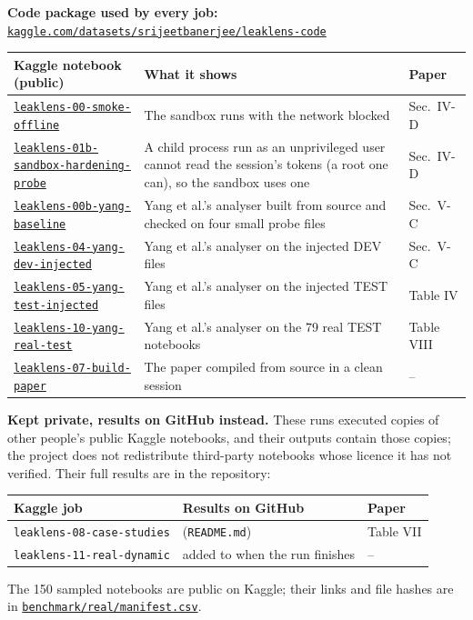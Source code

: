 \documentclass[10pt,a4paper]{article}
\newcommand{\K}[1]{\href{https://www.kaggle.com/code/srijeetbanerjee/#1}{\texttt{#1}}}
\newcommand{\G}[1]{\href{https://github.com/bytes06runner/LeakLens/tree/main/#1}{\texttt{\detokenize{#1}}}}
\begin{document}
\textbf{Code package used by every job:} \href{https://www.kaggle.com/datasets/srijeetbanerjee/leaklens-code}{\texttt{kaggle.com/datasets/srijeetbanerjee/leaklens-code}}

\begin{tabularx}{\textwidth}{@{}lXl@{}}
\toprule
Kaggle notebook (public) & What it shows & Paper \\
\midrule
\K{leaklens-00-smoke-offline} & The sandbox runs with the network blocked & Sec.\ IV-D \\
\K{leaklens-01b-sandbox-hardening-probe} & A child process run as an unprivileged user cannot read the session's tokens (a root one can), so the sandbox uses one & Sec.\ IV-D \\
\K{leaklens-00b-yang-baseline} & Yang et al.'s analyser built from source and checked on four small probe files & Sec.\ V-C \\
\K{leaklens-04-yang-dev-injected} & Yang et al.'s analyser on the injected DEV files & Sec.\ V-C \\
\K{leaklens-05-yang-test-injected} & Yang et al.'s analyser on the injected TEST files & Table IV \\
\K{leaklens-10-yang-real-test} & Yang et al.'s analyser on the 79 real TEST notebooks & Table VIII \\
\K{leaklens-07-build-paper} & The paper compiled from source in a clean session & -- \\
\bottomrule
\end{tabularx}

\medskip
\textbf{Kept private, results on GitHub instead.} These runs executed copies of other people's public Kaggle
notebooks, and their outputs contain those copies; the project does not redistribute third-party notebooks whose
licence it has not verified. Their full results are in the repository:

\begin{tabularx}{\textwidth}{@{}lXl@{}}
\toprule
Kaggle job & Results on GitHub & Paper \\
\midrule
\texttt{leaklens-08-case-studies} & \G{results/2026-11-14_kaggle_08_case_studies_v4} (\texttt{README.md}) & Table VII \\
\texttt{leaklens-11-real-dynamic} & added to \G{results} when the run finishes & -- \\
\bottomrule
\end{tabularx}

The 150 sampled notebooks are public on Kaggle; their links and file hashes are in
\href{https://github.com/bytes06runner/LeakLens/blob/main/benchmark/real/manifest.csv}{\texttt{benchmark/real/manifest.csv}}.
\end{document}
